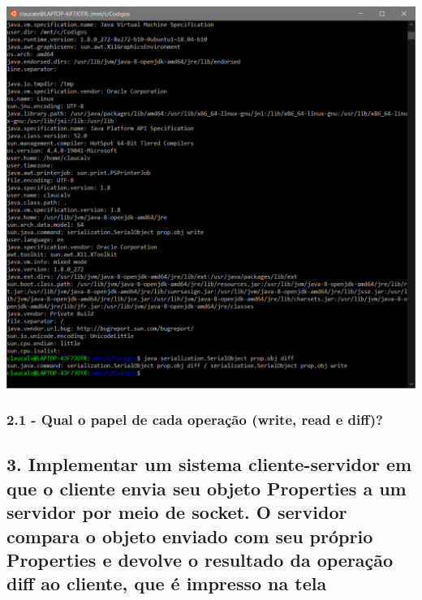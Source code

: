 \begin{minipage}{\textwidth}
    \hspace{1em}
    \includegraphics[scale=.35]{prints/serial3.PNG}
    \label{threadspng}
    \hspace{1em}
\end{minipage}
\vspace{0.5em}

\subsubsection{2.1 - Qual o papel de cada operação (write, read e diff)?}

\subsection*{3. Implementar um sistema cliente-servidor em que o cliente envia seu objeto Properties a um servidor por meio de socket. O servidor compara o objeto enviado com seu próprio Properties e devolve o resultado da operação diff ao cliente, que é impresso na tela}

